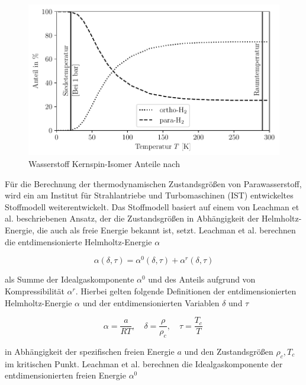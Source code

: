 \begin{figure}[ht]
	\centering
	\includegraphics[width=1\linewidth]{4_Abbildungen/2_Hauptteil/spin.pdf}
	\caption{Wasserstoff Kernspin-Isomer Anteile nach \cite{Buntkowsky.2022}}
	\label{fig:spin}
\end{figure}
\FloatBarrier 

Für die Berechnung der thermodynamischen Zustandsgrößen von Parawasserstoff, wird ein am Institut für Strahlantriebe und Turbomaschinen (IST) entwickeltes Stoffmodell weiterentwickelt. Das Stoffmodell basiert auf einem von Leachman et al. \cite{Leachman.2017} beschriebenen Ansatz, der die Zustandsgrößen in Abhängigkeit der Helmholtz-Energie, die auch als freie Energie bekannt ist, setzt. Leachman et al. berechnen die entdimensionierte Helmholtz-Energie $\alpha$ 

\begin{equation}\label{Eq:free-energy}
	\alpha(\delta, \tau) = \alpha^0(\delta, \tau) + \alpha^r(\delta, \tau)
\end{equation}

als Summe der Idealgaskomponente $\alpha^0$ und des Anteils aufgrund von Kompressibilität $\alpha^r$. Hierbei gelten folgende Definitionen der entdimensionierten Helmholtz-Energie $\alpha$ und der entdimensionierten Variablen $\delta$ und $\tau$

\begin{equation}
	\alpha = \frac{a}{RT}, \quad \delta = \frac{\rho}{\rho_c}, \quad \tau = \frac{T_c}{T} \,
\end{equation}

in Abhängigkeit der spezifischen freien Energie $a$ und den Zustandsgrößen $\rho_c, T_c$ im kritischen Punkt.  Leachman et al. berechnen die Idealgaskomponente der entdimensionierten freien Energie $\alpha^0$

